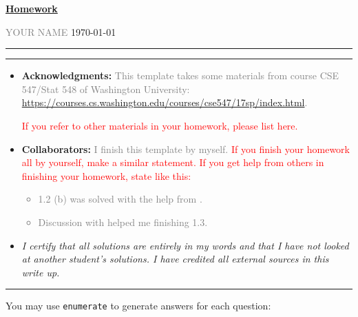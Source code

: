 \documentclass[a4paper]{article}
\begin{document}
\courseheader



\setcounter{hwcnt}{1} %

\begin{center}
  \underline{\bf Homework \thehwcnt} \\
\end{center}
\begin{flushleft}
  \textcolor{gray}{YOUR NAME}\hfill
  \today
\end{flushleft}
\hrule

\vspace{2em}

\flushleft
\rule{\textwidth}{1pt}
\begin{itemize}
\item {\bf Acknowledgments: \/} 
  \textcolor{gray}{This template takes some materials from course CSE 547/Stat 548 of Washington University: \small{\url{https://courses.cs.washington.edu/courses/cse547/17sp/index.html}}.}

  \textcolor{red}{If you refer to other materials in your homework, please list here.}
\item {\bf Collaborators: \/}
  \textcolor{gray}{I finish this template by myself.} \textcolor{red}{If you finish your homework all by yourself, make a similar statement. If you get help from others in finishing your homework, state like this:}
  \textcolor{gray}{
  \begin{itemize}
  \item 1.2 (b) was solved with the help from \underline{\hspace{3em}}.
  \item Discussion with \underline{\hspace{3em}} helped me finishing 1.3.
  \end{itemize}
}
\item  \emph{I certify that all solutions are entirely in my words and that I have not looked at another student's solutions. I have credited all external sources in this write up.}
  \framebox[\linewidth]{\rule{0pt}{10pt}\textcolor{gray}{\large Your signature}}
\end{itemize}
\rule{\textwidth}{1pt}


\vspace{2em}

You may use \texttt{enumerate} to generate answers for each question:
\end{document}
